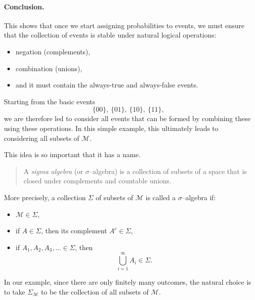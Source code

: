 \documentclass[11pt]{article}
\theoremstyle{remark}
\newcommand{\modelspace}{\mathcal{M}}
\begin{document}
\vspace{2mm}

\paragraph{Conclusion.}

This shows that once we start assigning probabilities to events, we must ensure that the collection of events is stable under natural logical operations:

\begin{itemize}
    \item negation (complements),
    \item combination (unions),
    \item and it must contain the always-true and always-false events.
\end{itemize}

Starting from the basic events
\[
\{00\},\ \{01\},\ \{10\},\ \{11\},
\]
we are therefore led to consider all events that can be formed by combining these using these operations. In this simple example, this ultimately leads to considering all subsets of \(\modelspace\).
\vspace{2mm}

This idea is so important that it has a name.

\begin{quote}
A \emph{sigma algebra} (or \(\sigma\)--algebra) is a collection of subsets of a space that is closed under complements and countable unions.
\end{quote}

More precisely, a collection \(\Sigma\) of subsets of \(\modelspace\) is called a \(\sigma\)--algebra if:

\begin{itemize}
    \item \(\modelspace \in \Sigma\),
    \item if \(A \in \Sigma\), then its complement \(A^c \in \Sigma\),
    \item if \(A_1, A_2, A_3, \ldots \in \Sigma\), then
    \[
    \bigcup_{i=1}^\infty A_i \in \Sigma.
    \]
\end{itemize}

\vspace{2mm}

In our example, since there are only finitely many outcomes, the natural choice is to take \(\Sigma_{\modelspace}\) to be the collection of all subsets of \(\modelspace\).
\end{document}
